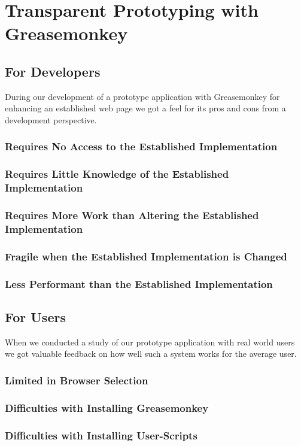 

\section{Transparent Prototyping with Greasemonkey}

\subsection{For Developers}

During our development of a prototype application with Greasemonkey for
enhancing an established web page we got a feel for its pros and cons from a
development perspective.

\subsubsection{Requires No Access to the Established Implementation}

\subsubsection{Requires Little Knowledge of the Established Implementation}

\subsubsection{Requires More Work than Altering the Established Implementation}

\subsubsection{Fragile when the Established Implementation is Changed}

\subsubsection{Less Performant than the Established Implementation}

\subsection{For Users}

When we conducted a study of our prototype application with real world users
we got valuable feedback on how well such a system works for the average user.


\subsubsection{Limited in Browser Selection}

\subsubsection{Difficulties with Installing Greasemonkey}

\subsubsection{Difficulties with Installing User-Scripts}

